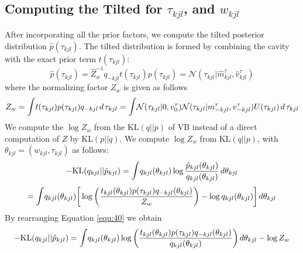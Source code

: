 \documentclass[]{article}
\begin{document}
\subsection{Computing the Tilted for $\tau_{kjl}$, and $w_{kjl}$}
After incorporating all the prior factors, we compute the tilted posterior distribution $\hat{p}(\tau_{kjl})$. The tilted distribution is formed by combining the cavity with the exact prior term $t(\tau_{kjl})$:
\begin{equation}
	\hat{p}(\tau_{kjl}) = \hat{Z}_w^{-1} q_{-kjl}t(\tau_{kjl})p(\tau_{kjl}) = \mathcal{N}(\tau_{kjl}|\hat{m}^\tau_{kjl}, \hat{v}^\tau_{kjl})
	\label{equ:37}
\end{equation} 
where the normalizing factor $Z_w$ is given as follows
\begin{equation}
	Z_w = \mathlarger \int t(\tau_{kjl})p(\tau_{kjl})q_{-kjl}\hspace{0.02in}d\hspace{0.02in}\tau_{kjl} = \mathlarger \int \mathcal{N}(\tau_{kjl}|0,v^\tau_0)\mathcal{N}(\tau_{kjl}|m^\tau_{-kjl},v^\tau_{-kjl})U(\tau_{kjl})\hspace{0.02in}d\hspace{0.02in}\tau_{kjl}
	\label{equ:38}
\end{equation}
We compute the $\log Z_w$ from the $\text{KL}(q||p)$ of VB instead of a direct computation of $Z$ by $\text{KL}(p||q)$. We compute $\log Z_w$ from $\text{KL}(q||p)$, with $\theta_{kjl} = (w_{kjl},\tau_{kjl})$ as follows:
\begin{equation}
	-\text{KL}(q_{kjl}||\hat{p}_{kjl}) = \mathlarger \int q_{kjl}(\theta_{kjl}) \log \frac{\hat{p}_{kjl}(\theta_{kjl})}{q_{kjl}(\theta_{kjl})} \hspace{0.02in} d\theta_{kjl}
	\label{equ:39}
\end{equation}
\begin{equation}
	= \mathlarger \int q_{kjl}(\theta_{kjl}) \bigg[\log\bigg( \frac{{t}_{kjl}(\theta_{kjl})p(\tau_{kjl})q_{-kjl}(\theta_{kjl})}{Z_w}\bigg) - \log q_{kjl}(\theta_{kjl})\bigg] \hspace{0.02in} d\theta_{kjl}
	\label{equ:40}
\end{equation}
By rearranging Equation \ref{equ:40} we obtain
\begin{equation}
	-\text{KL}(q_{kjl}||\hat{p}_{kjl}) = \mathlarger \int q_{kjl}(\theta_{kjl}) \log\bigg( \frac{{t}_{kjl}(\theta_{kjl})p(\tau_{kjl})q_{-kjl}(\theta_{kjl})}{q_{kjl}(\theta_{kjl})}\bigg)\hspace{0.02in} d\theta_{kjl} - \log Z_w 
	\label{equ:41}
\end{equation}
\end{document}
